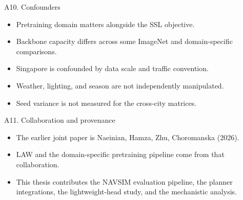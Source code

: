 \documentclass[aspectratio=169, xcolor={table}]{beamer}
\begin{document}
\begin{frame}{A10. Confounders}
  \begin{itemize}
    \item Pretraining domain matters alongside the SSL objective.
    \item Backbone capacity differs across some ImageNet and domain-specific comparisons.
    \item Singapore is confounded by data scale and traffic convention.
    \item Weather, lighting, and season are not independently manipulated.
    \item Seed variance is not measured for the cross-city matrices.
  \end{itemize}
\end{frame}

\begin{frame}{A11. Collaboration and provenance}
  \begin{itemize}
    \item The earlier joint paper is Naeinian, Hamza, Zhu, Choromanska (2026).
    \item LAW and the domain-specific pretraining pipeline come from that collaboration.
    \item This thesis contributes the NAVSIM evaluation pipeline, the planner integrations, the lightweight-head study, and the mechanistic analysis.
  \end{itemize}
\end{frame}
\end{document}
